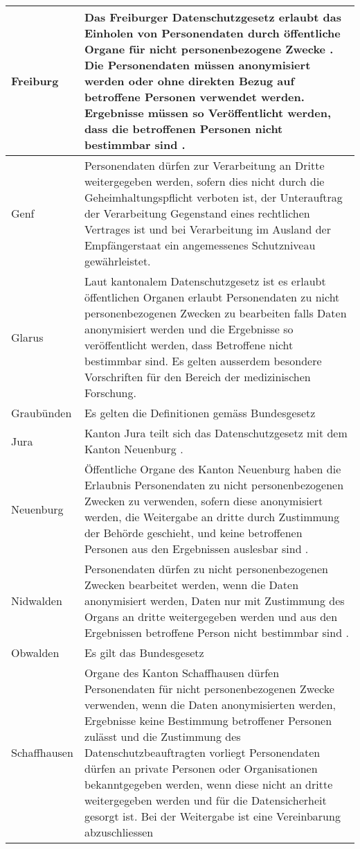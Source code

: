 \begin{longtable}{| p{} | p{}|}
		\hline
		Freiburg & Das Freiburger Datenschutzgesetz erlaubt das Einholen von Personendaten durch öffentliche Organe für nicht personenbezogene Zwecke \parencite[§§ 14 Abs. 1]{DSSGFR}. Die Personendaten müssen anonymisiert werden oder ohne direkten Bezug auf betroffene Personen verwendet werden. Ergebnisse müssen so Veröffentlicht werden, dass die betroffenen Personen nicht bestimmbar sind \parencite[§ 16 Abs. 1-2]{DSSGFR}.  \\
		\hline
    Genf & Personendaten dürfen zur Verarbeitung an Dritte weitergegeben werden, sofern dies nicht durch die Geheimhaltungspflicht verboten ist, der Unterauftrag der Verarbeitung Gegenstand eines rechtlichen Vertrages ist und bei Verarbeitung im Ausland der Empfängerstaat ein angemessenes Schutzniveau gewährleistet.     \parencite[§§ 13A Abs. 1-5]{DSSGGE} \\
		\hline
		Glarus & Laut kantonalem Datenschutzgesetz ist es erlaubt öffentlichen Organen erlaubt Personendaten zu nicht personenbezogenen Zwecken zu bearbeiten falls Daten anonymisiert werden und die Ergebnisse so veröffentlicht werden, dass Betroffene nicht bestimmbar sind. Es gelten ausserdem besondere Vorschriften für den Bereich der medizinischen Forschung.  \parencite[§§ 11 Abs 1-2]{DSSGGL} \\
		\hline
		Graubünden & Es gelten die Definitionen gemäss Bundesgesetz \parencite[§§ 2 Abs. 2-3]{DSSGGR}  \\
		\hline
		Jura & Kanton Jura teilt sich das Datenschutzgesetz mit dem Kanton Neuenburg \parencite[S. 1 Abs. 2]{JURAAbkommenNE}. \\
		\hline
		Neuenburg & Öffentliche Organe des Kanton Neuenburg haben die Erlaubnis Personendaten zu nicht personenbezogenen Zwecken zu verwenden, sofern diese anonymisiert werden, die Weitergabe an dritte durch Zustimmung der Behörde geschieht, und keine betroffenen Personen aus den Ergebnissen auslesbar sind \parencite[§§ 25 Abs. 1]{DSSGNE}. \\
		\hline
		Nidwalden & Personendaten dürfen zu nicht personenbezogenen Zwecken bearbeitet werden, wenn die Daten anonymisiert werden, Daten nur mit Zustimmung des Organs an dritte weitergegeben werden und aus den Ergebnissen betroffene Person nicht bestimmbar sind \parencite[§§ 16 Abs 1-2]{DSSGNW}. \\
		\hline
		Obwalden & Es gilt das Bundesgesetz \parencite{DSSGOW} \\
		\hline
		Schaffhausen & Organe des Kanton Schaffhausen dürfen Personendaten für nicht personenbezogenen Zwecke verwenden, wenn die Daten anonymisierten werden, Ergebnisse keine Bestimmung betroffener Personen zulässt und die Zustimmung des Datenschutzbeauftragten vorliegt \parencite[§§ 12 Abs. 1]{DSSGSH} Personendaten dürfen an private Personen oder Organisationen bekanntgegeben werden, wenn diese nicht an dritte weitergegeben werden und für die Datensicherheit gesorgt ist. Bei der Weitergabe ist eine Vereinbarung abzuschliessen \parencite[§§ 12 Abs 2]{DSSGSH} \\

\end{longtable}
